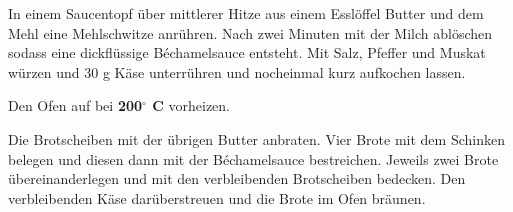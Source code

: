 \vspace*{\fill}
\begin{multicols}{2}

In einem Saucentopf über mittlerer Hitze aus einem Esslöffel Butter und dem Mehl eine Mehlschwitze anrühren.\newline
Nach zwei Minuten mit der Milch ablöschen sodass eine dickflüssige Béchamelsauce entsteht.\newline
Mit Salz, Pfeffer und Muskat würzen und 30 g Käse unterrühren und nocheinmal kurz aufkochen lassen.\newline

Den Ofen auf bei \textbf{200$^\circ$ C} vorheizen. \newline

Die Brotscheiben mit der übrigen Butter anbraten.\newline
Vier Brote mit dem Schinken belegen und diesen dann mit der Béchamelsauce bestreichen.
Jeweils zwei Brote übereinanderlegen und mit den verbleibenden Brotscheiben bedecken.\newline
Den verbleibenden Käse darüberstreuen und die Brote im Ofen bräunen. 

\end{multicols}

\vfill



 
